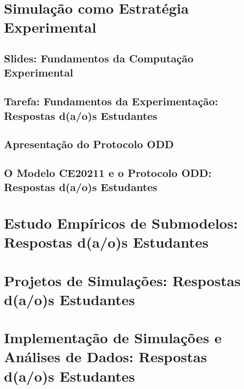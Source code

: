 \documentclass[12pt]{book}
\begin{document}


\part{Simulação como Estratégia Experimental\label{part:simulacao:estrategia}}

\chapter{Slides: Fundamentos da Computação Experimental\label{fundamentos:ce}}



\chapter{Tarefa: Fundamentos da Experimentação: Respostas d(a/o)s Estudantes}

%

%

\chapter{Apresentação do Protocolo ODD\label{oddprotocol}}
	
%

\chapter{O Modelo CE20211 e o Protocolo ODD: Respostas d(a/o)s Estudantes}

%

%    

\part{Estudo Empíricos de Submodelos: Respostas d(a/o)s Estudantes\label{part:submodelos:empiricos}}

%

\part{Projetos de Simulações: Respostas d(a/o)s Estudantes\label{part:projetos:simulacoes}}

%

\part{Implementação de Simulações e Análises de Dados: Respostas d(a/o)s Estudantes\label{part:implement:simulacoes}}

%



\end{document}
